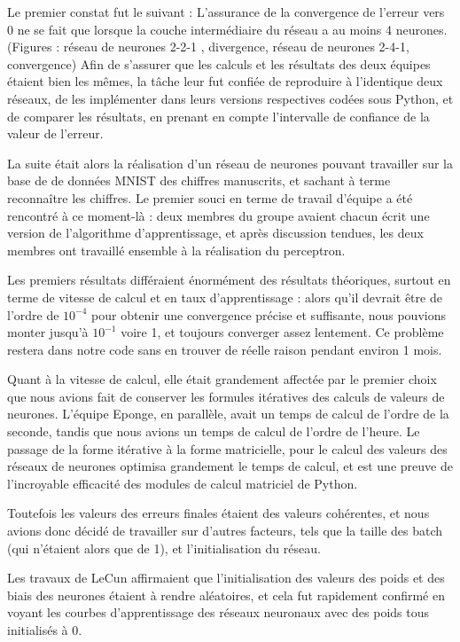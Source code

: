 \documentclass[
    10pt,
    a4paper,
    oneside,
    headinclude,footinclude,
    BCOR=5mm,
]{scrartcl}
\begin{document}
Le premier constat fut le suivant : L'assurance de la convergence de l'erreur vers 0 ne se fait que lorsque la couche intermédiaire du réseau a au moins 4 neurones. (Figures : réseau de neurones 2-2-1 , divergence, réseau de neurones 2-4-1, convergence) Afin de s'assurer que les calculs et les résultats des deux équipes étaient bien les mêmes, la tâche leur fut confiée de reproduire à l'identique deux réseaux, de les implémenter dans leurs versions respectives codées sous Python, et de comparer les résultats, en prenant en compte l'intervalle de confiance de la valeur de l'erreur.

La suite était alors la réalisation d'un réseau de neurones pouvant travailler sur la base de de données MNIST des chiffres manuscrits, et sachant à terme reconnaître les chiffres. Le premier souci en terme de travail d'équipe a été rencontré à ce moment-là : deux membres du groupe avaient chacun écrit une version de l'algorithme d'apprentissage, et après discussion tendues, les deux membres ont travaillé ensemble à la réalisation du perceptron.

Les premiers résultats différaient énormément des résultats théoriques, surtout en terme de vitesse de calcul et en taux d'apprentissage : alors qu'il devrait être de l'ordre de $10^{-4}$ pour obtenir une convergence précise et suffisante, nous pouvions monter jusqu'à $10^{-1}$ voire 1, et toujours converger assez lentement. Ce problème restera dans notre code sans en trouver de réelle raison pendant environ 1 mois.

Quant à la vitesse de calcul, elle était grandement affectée par le premier choix que nous avions fait de conserver les formules itératives des calculs de valeurs de neurones. L'équipe Eponge, en parallèle, avait un temps de calcul de l'ordre de la seconde, tandis que nous avions un temps de calcul de l'ordre de l'heure. Le passage de la forme itérative à la forme matricielle, pour le calcul des valeurs des réseaux de neurones optimisa grandement le temps de calcul, et est une preuve de l'incroyable efficacité des modules de calcul matriciel de Python. 

Toutefois les valeurs des erreurs finales étaient des valeurs cohérentes, et nous avions donc décidé de travailler sur d'autres facteurs, tels que la taille des batch (qui n'étaient alors que de 1), et l'initialisation du réseau.

Les travaux de LeCun affirmaient que l'initialisation des valeurs des poids et des biais des neurones étaient à rendre aléatoires, et cela fut rapidement confirmé en voyant les courbes d'apprentissage des réseaux neuronaux avec des poids tous initialisés à 0.
\end{document}
